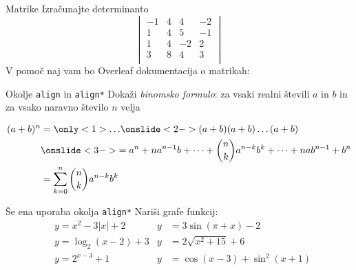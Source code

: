 
\begin{frame}{Matrike}
	Izračunajte determinanto
$$
	\begin{vmatrix}
		-1 & 4 & 4 & -2 \\
		1 & 4 & 5 & -1 \\
		1 & 4 & -2 & 2 \\
		3 & 8 & 4 & 3 \\
	\end{vmatrix}
$$
	V pomoč naj vam bo Overleaf dokumentacija o matrikah:
	
	\href{https://www.overleaf.com/learn/latex/Matrices}{}
\end{frame}

\begin{frame}{Okolje \texttt{align} in \texttt{align*}}
	Dokaži \emph{binomsko formulo}: za vsaki realni števili $a$ in $b$ in za vsako naravno število $n$ velja
	
	\begin{align*}
		(a+b)^n &= \only<1>{\ldots} 
		\onslide<2->{ (a+b) (a+b) \dots (a+b)} \\
		&\onslide<3->{= a^n + n a^{n-1} b + \dots + \binom{n}{k} a^{n-k} b^k + \dots + n a b^{n-1} + b^n} \\
		&= \sum_{k=0}^n \binom{n}{k} a^{n-k} b^k 
	\end{align*}

\end{frame}
   
\begin{frame}{Še ena uporaba okolja \texttt{align*}}
	Nariši grafe funkcij:
	\begin{align*}
	&y = x^2 - 3|x| + 2&y& = 3 \sin(\pi+x) - 2 \\
	&y = \log_2(x-2) + 3&y& = 2 \sqrt{x^2+15} + 6 \\
	&y = 2^{x-3} + 1&y& = \cos(x-3) + \sin^2(x+1)\\ 
	\end{align*}
\end{frame}

